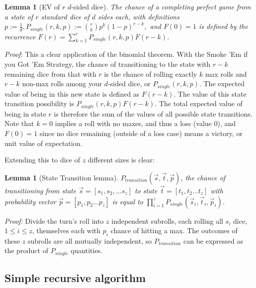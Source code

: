 \documentclass[11pt, oneside]{article} 	%
\newtheorem{lemma}[theorem]{Lemma}
\begin{document}
\begin{lemma}[EV of $r$ $d$-sided dice]The chance of a completing perfect game from a state of $r$ standard dice of $d$ sides each, with definitions $p := \frac1{d}, P_{single}(r, k, p) := {r \choose k} p^k(1-p)^{r-k},$ and $F(0) = 1$ is defined by the recurrence $F(r) = \sum_{k=1}^r P_{single}(r,k,p) F(r-k)$. \end{lemma}

\textit{Proof}: This a clear application of the binomial theorem.  With the Smoke 'Em if you Got 'Em Strategy, the chance of transitioning to the state with $r-k$ remaining dice from that with $r$ is the chance of rolling exactly $k$ max rolls and $r-k$ non-max rolls among your $d$-sided dice, or $P_{single}(r, k, p)$.  The expected value of being in this new state is defined as $F(r-k)$.  The value of this state transition possibility is $P_{single}(r, k, p)F(r-k)$. The total expected value of being in state $r$ is therefore the sum of the values of all possible state transitions.  Note that $k=0$ implies a roll with no maxes, and thus a loss (value 0), and $F(0) = 1$ since no dice remaining (outside of a loss case) means a victory, or unit value of expectation.

Extending this to dice of $z$ different sizes is clear:

\begin{lemma}[State Transition lemma] $P_{transition}(\vec{s},\vec{t},\vec{p})$, the chance of transitioning from state $\vec{s}=[s_1,s_2,\ldots s_z]$ to state $\vec{t} = [{t}_1, {t}_2\ldots {t}_z]$ with probability vector $\vec{p} = [p_1, p_2 \ldots p_z]$ is equal to
  $\prod_{i=1}^z P_{single}(\vec{s}_i ,\vec{t}_i,\vec{p}_i)$.\end{lemma}


\textit{Proof:} Divide the turn's roll into $z$ independent subrolls, each rolling all $s_i$ dice, $1 \leq i \leq z$, themselves each with $p_i$ chance of hitting a max.  The outcomes of these $z$ subrolls are all mutually independent, so $P_{transition}$ can be expressed as the product of $P_{single}$ quantities.

\subsection{Simple recursive algorithm}
\end{document}
